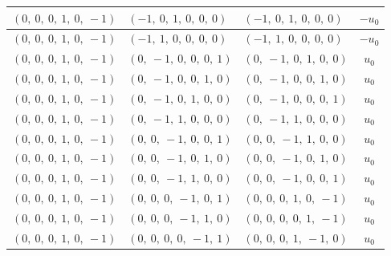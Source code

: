 \documentclass[11pt]{article}
\theoremstyle{definition}
\begin{document}
\begin{longtable}{|l|l|l|c|}
    \hline
    $\left( 0, \  0, \  0, \  1, \  0, \  -1\right)$ & $\left( -1, \  0, \  1, \  0, \  0, \  0\right)$ & $\left( -1, \  0, \  1, \  0, \  0, \  0\right)$ & $- u_{0}$ \\
    \hline
    $\left( 0, \  0, \  0, \  1, \  0, \  -1\right)$ & $\left( -1, \  1, \  0, \  0, \  0, \  0\right)$ & $\left( -1, \  1, \  0, \  0, \  0, \  0\right)$ & $- u_{0}$ \\
    \hline
    $\left( 0, \  0, \  0, \  1, \  0, \  -1\right)$ & $\left( 0, \  -1, \  0, \  0, \  0, \  1\right)$ & $\left( 0, \  -1, \  0, \  1, \  0, \  0\right)$ & $u_{0}$ \\
    \hline
    $\left( 0, \  0, \  0, \  1, \  0, \  -1\right)$ & $\left( 0, \  -1, \  0, \  0, \  1, \  0\right)$ & $\left( 0, \  -1, \  0, \  0, \  1, \  0\right)$ & $u_{0}$ \\
    \hline
    $\left( 0, \  0, \  0, \  1, \  0, \  -1\right)$ & $\left( 0, \  -1, \  0, \  1, \  0, \  0\right)$ & $\left( 0, \  -1, \  0, \  0, \  0, \  1\right)$ & $u_{0}$ \\
    \hline
    $\left( 0, \  0, \  0, \  1, \  0, \  -1\right)$ & $\left( 0, \  -1, \  1, \  0, \  0, \  0\right)$ & $\left( 0, \  -1, \  1, \  0, \  0, \  0\right)$ & $u_{0}$ \\
    \hline
    $\left( 0, \  0, \  0, \  1, \  0, \  -1\right)$ & $\left( 0, \  0, \  -1, \  0, \  0, \  1\right)$ & $\left( 0, \  0, \  -1, \  1, \  0, \  0\right)$ & $u_{0}$ \\
    \hline
    $\left( 0, \  0, \  0, \  1, \  0, \  -1\right)$ & $\left( 0, \  0, \  -1, \  0, \  1, \  0\right)$ & $\left( 0, \  0, \  -1, \  0, \  1, \  0\right)$ & $u_{0}$ \\
    \hline
    $\left( 0, \  0, \  0, \  1, \  0, \  -1\right)$ & $\left( 0, \  0, \  -1, \  1, \  0, \  0\right)$ & $\left( 0, \  0, \  -1, \  0, \  0, \  1\right)$ & $u_{0}$ \\
    \hline
    $\left( 0, \  0, \  0, \  1, \  0, \  -1\right)$ & $\left( 0, \  0, \  0, \  -1, \  0, \  1\right)$ & $\left( 0, \  0, \  0, \  1, \  0, \  -1\right)$ & $u_{0}$ \\
    \hline
    $\left( 0, \  0, \  0, \  1, \  0, \  -1\right)$ & $\left( 0, \  0, \  0, \  -1, \  1, \  0\right)$ & $\left( 0, \  0, \  0, \  0, \  1, \  -1\right)$ & $u_{0}$ \\
    \hline
    $\left( 0, \  0, \  0, \  1, \  0, \  -1\right)$ & $\left( 0, \  0, \  0, \  0, \  -1, \  1\right)$ & $\left( 0, \  0, \  0, \  1, \  -1, \  0\right)$ & $u_{0}$ \\

\end{longtable}
\end{document}
